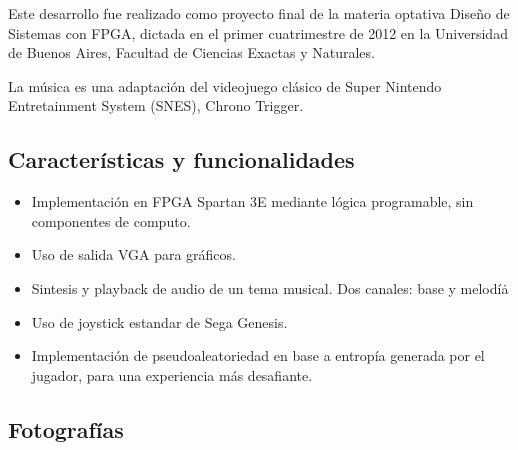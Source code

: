 \documentclass[10pt, a4paper,english,spanish]{article}
\begin{document}
Este desarrollo fue realizado como proyecto final de la materia optativa
Diseño de Sistemas con FPGA, dictada en el primer cuatrimestre de 2012
en la Universidad de Buenos Aires, Facultad de Ciencias Exactas y
Naturales.

La música es una adaptación del videojuego clásico de Super Nintendo
Entretainment System (SNES), Chrono Trigger.

\subsection{Caracter\'isticas y funcionalidades}

\begin{itemize}
	\item Implementación en FPGA Spartan 3E mediante lógica programable, sin 
	componentes de computo.
	\item Uso de salida VGA para gráficos.
	\item Sintesis y playback de audio de un tema musical. Dos canales: base y
	melod\'ia\.
	\item Uso de joystick estandar de Sega Genesis.
	\item Implementación de pseudoaleatoriedad en base a entropía generada por 
	el jugador, para una experiencia más desafiante.
\end{itemize}

\subsection{Fotograf\'ias}
\end{document}
